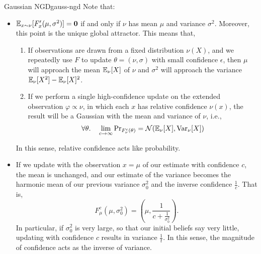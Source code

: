 \documentclass{article}
\begin{document}
\begin{examplex}{Gaussian NGD}{gauss-ngd}
    Note that:
    \begin{itemize}
        \item  $\operatorname*{\mathbb{E}}_{x \sim \nu} [ F'_x(\mu,\sigma^2) ] = \mathbf{0}$ if and only if $\nu$ has mean $\mu$ and variance $\sigma^2$.
        Moreover, this point is the unique global attractor.
        This means that,
        \begin{enumerate}
            \item If observations are drawn from a fixed distribution $\nu(X)$, and we repeatedly use $F$ to update $\theta = (\nu, \sigma)$ with small confidence $\epsilon$,
            then $\mu$ will approach the mean $\operatorname*{\mathbb{E}}_{\nu}[X]$ of $\nu$
            and $\sigma^2$ will approach the variance $\operatorname*{\mathbb{E}}_{\nu}[X^2] - \operatorname*{\mathbb{E}}_{\nu}[X]^2$.

            \item If we perform a single high-confidence update on the extended observation $\varphi \propto \nu$, in which each $x$ has relative confidence $\nu(x)$, the result will be a Gaussian with the mean and variance of $\nu$, i.e.,
            \[
                \forall \theta.\quad
                \lim_{c \to \infty} \Pr\nolimits_{F_{\nu}^c(\theta)} = \mathcal N(\operatorname*{\mathbb{E}}\nolimits_{\nu}[X], {\mathrm{Var}}_{\nu}[X])
            \]
        \end{enumerate}
        In this sense, relative confidence acts like probability.

        \item
        If we update with the observation $x = \mu$ of our estimate with confidence $c$,
        the mean is unchanged, and our estimate of the variance becomes the harmonic mean of our previous variance $\sigma_0^2$ and the inverse confidence $\frac1c$.
        That is,
        \[
            F^c_\mu(\mu, \sigma_0^2) =
            \left(\mu, \frac{1}{c + \frac{1}{\sigma_0^2}} \right).
        \]
        In particular, if $\sigma_0^2$ is very large, so that our initial beliefs say very little, updating with confidence $c$ results in variance $\frac1t$.
        In this sense, the magnitude of confidence acts as the inverse of variance.
    \end{itemize}
\end{examplex}
\end{document}
